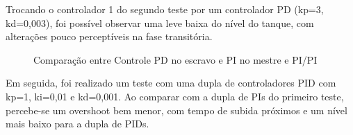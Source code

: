 \documentclass[a4paper,12pt]{article}
\begin{document}
Trocando o controlador 1 do segundo teste por um controlador PD (kp=3, kd=0,003), foi possível observar uma leve baixa do nível do tanque, com alterações pouco perceptíveis na fase transitória.
\begin{figure}[H]
     \centering
\hspace{1cm}
     
     \caption{Comparação entre Controle PD no escravo e PI no mestre e PI/PI}
     \label{fig:ControlePIPD}
\end{figure}

Em seguida, foi realizado um teste com uma dupla de controladores PID com kp=1, ki=0,01 e kd=0,001. Ao comparar com a dupla de PIs do primeiro teste, percebe-se um overshoot bem menor, com tempo de subida próximos e um nível mais baixo para a dupla de PIDs.
\end{document}
